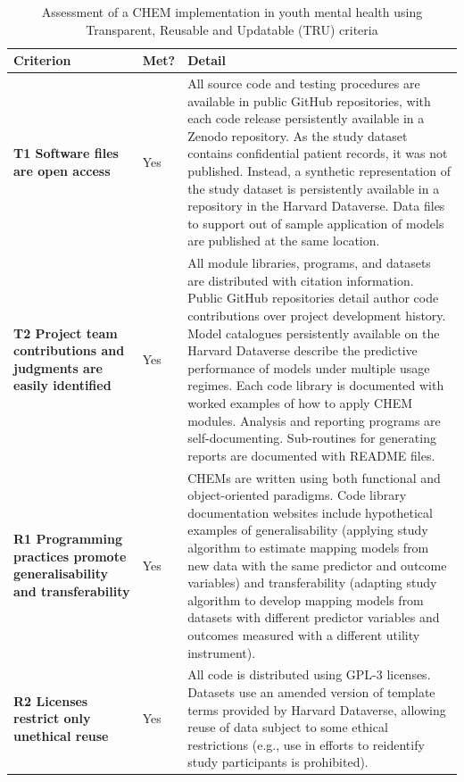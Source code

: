 \documentclass[sn-vancouver,Numbered,pdflatex]{sn-jnl}
\theoremstyle{remark}
\theoremstyle{definition}
\begin{document}
\begin{landscape}

\begin{table}

\caption{\label{tab:checktb}Assessment of a CHEM implementation in youth mental health using Transparent, Reusable and Updatable (TRU) criteria}
\centering
\begin{tabular}[t]{>{\raggedright\arraybackslash}p{10em}l>{\raggedright\arraybackslash}p{35em}}
\toprule
Criterion & Met? & Detail\\
\midrule
\textbf{T1 Software files are open access} & Yes & All source code and testing procedures are available in public GitHub repositories, with each code release persistently available in a Zenodo repository. As the study dataset contains confidential patient records, it was not published. Instead, a synthetic representation of the study dataset is persistently available in a repository in the Harvard Dataverse. Data files to support out of sample application of models are published at the same location.\\
\textbf{T2 Project team contributions and judgments are easily identified} & Yes & All module libraries, programs, and datasets are distributed with citation information. Public GitHub repositories detail author code contributions over project development history. Model catalogues persistently available on the Harvard Dataverse describe the predictive performance of models under multiple usage regimes. Each code library is documented with worked examples of how to apply CHEM modules.  Analysis and reporting programs are self-documenting.  Sub-routines for generating reports are documented with README files.\\
\textbf{R1 Programming practices promote generalisability and transferability} & Yes & CHEMs are written using both functional and object-oriented paradigms. Code library documentation websites include hypothetical examples of generalisability (applying study algorithm to estimate mapping models from new data with the same predictor and outcome variables) and transferability (adapting study algorithm to develop mapping models from datasets with different predictor variables and outcomes measured with a different utility instrument).\\
\textbf{R2 Licenses restrict only unethical reuse} & Yes & All code is distributed using GPL-3 licenses. Datasets use an amended version of template terms provided by Harvard Dataverse, allowing reuse of data subject to some ethical restrictions (e.g., use in efforts to reidentify study participants is prohibited).\\

\end{tabular}
\end{table}
\end{landscape}
\end{document}
